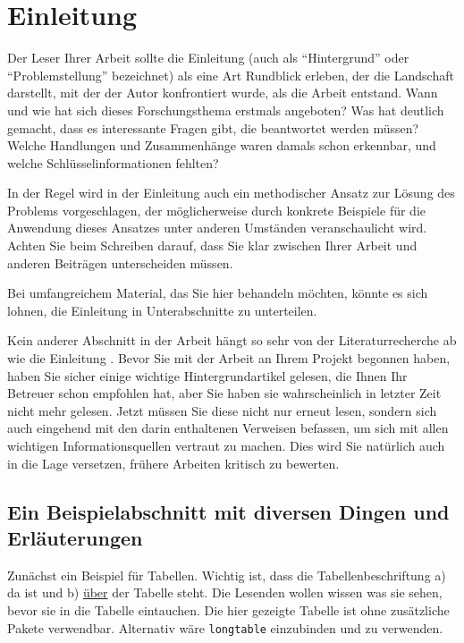 
\chapter{Einleitung}

Der Leser Ihrer Arbeit sollte die Einleitung (auch als \enquote{Hintergrund} oder \enquote{Problemstellung} bezeichnet) als eine Art Rundblick erleben, 
der die Landschaft darstellt, mit der der Autor konfrontiert wurde, als die Arbeit entstand. Wann und wie hat sich dieses Forschungsthema erstmals angeboten? 
Was hat deutlich gemacht, dass es interessante Fragen gibt, die beantwortet werden müssen? Welche Handlungen und Zusammenhänge waren damals schon erkennbar, und welche Schlüsselinformationen fehlten? 

In der Regel wird in der Einleitung auch ein methodischer Ansatz zur Lösung des Problems vorgeschlagen, 
der möglicherweise durch konkrete Beispiele für die Anwendung dieses Ansatzes unter anderen Umständen veranschaulicht wird. 
Achten Sie beim Schreiben darauf, dass Sie klar zwischen Ihrer Arbeit und anderen Beiträgen unterscheiden müssen.

Bei umfangreichem Material, das Sie hier behandeln möchten, könnte es sich lohnen, die Einleitung in Unterabschnitte zu unterteilen.

Kein anderer Abschnitt in der Arbeit hängt so sehr von der Literaturrecherche ab wie die Einleitung \cite{aoscw2004}. 
Bevor Sie mit der Arbeit an Ihrem Projekt begonnen haben, haben Sie sicher einige wichtige Hintergrundartikel gelesen, 
die Ihnen Ihr Betreuer schon empfohlen hat, aber Sie haben sie wahrscheinlich in letzter Zeit nicht mehr gelesen. 
Jetzt müssen Sie diese nicht nur erneut lesen, sondern sich auch eingehend mit den darin enthaltenen Verweisen befassen, 
um sich mit allen wichtigen Informationsquellen vertraut zu machen. Dies wird Sie natürlich auch in die Lage versetzen, 
frühere Arbeiten kritisch zu bewerten.

\newpage

\section{Ein Beispielabschnitt mit diversen Dingen und Erläuterungen}
Zunächst ein Beispiel für Tabellen. Wichtig ist, dass die Tabellenbeschriftung a) da ist und b) \underline{über} der Tabelle steht. Die Lesenden wollen wissen was sie sehen, bevor sie in die Tabelle eintauchen.
Die hier gezeigte Tabelle ist ohne zusätzliche Pakete verwendbar. Alternativ wäre \texttt{longtable} einzubinden und zu verwenden.

